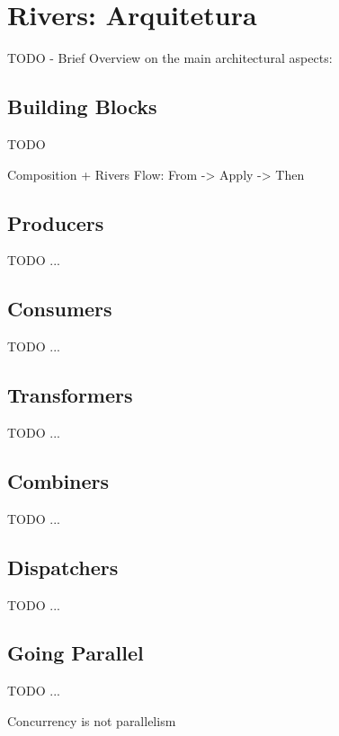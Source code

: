 \chapter{Rivers: Arquitetura}
\label{cha:rivers_architecture}

TODO - Brief Overview on the main architectural aspects:

\section{Building Blocks}
\label{sec:building_blocks}

TODO

Composition + Rivers Flow: From -> Apply -> Then

\section{Producers}
\label{sec:producers}

TODO ...

\section{Consumers}
\label{sec:consumers}

TODO ...

\section{Transformers}
\label{sec:transformers}

TODO ...

\section{Combiners}
\label{sec:combiners}

TODO ...

\section{Dispatchers}
\label{sec:dispatchers}

TODO ...

\section{Going Parallel}
\label{sec:going_parallel}

TODO ...

Concurrency is not parallelism


